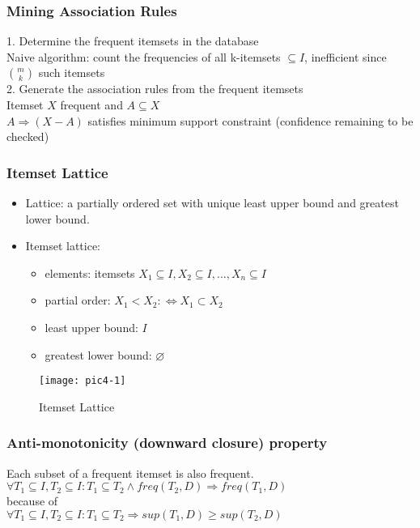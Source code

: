 \documentclass[../notes.tex]{subfiles}
\begin{document}
\subsubsection{Mining Association Rules}
1. Determine the frequent itemsets in the database \\
Naive algorithm: count the frequencies of all k-itemsets $\subseteq I$, inefficient since $\binom mk$ such itemsets \\

2. Generate the association rules from the frequent itemsets \\
Itemset $X$ frequent and $A \subseteq X$ \\
$A \Rightarrow (X-A)$ satisfies minimum support constraint (confidence remaining to be checked)

\subsubsection{Itemset Lattice}
\begin{itemize}
  \item Lattice: a partially ordered set with unique least upper bound and greatest lower bound.
  \item Itemset lattice:
    \begin{itemize}
      \item elements: itemsets $X_1 \subseteq I, X_2 \subseteq I, ..., X_n \subseteq I$
      \item partial order: $X_1 < X_2 :\Leftrightarrow X_1 \subset X_2$
      \item least upper bound: $I$
      \item greatest lower bound: $\varnothing$
    \end{itemize}
\end{itemize}

\begin{figure}[h]
\centering
\caption{Itemset Lattice}
\texttt{[image: pic4-1]}
\end{figure}

\subsubsection{Anti-monotonicity (downward closure) property}
Each subset of a frequent itemset is also frequent. \\
$\forall T_1 \subseteq I, T_2 \subseteq I: T_1 \subseteq T_2 \land freq(T_2, D) \Rightarrow freq(T_1, D)$ \\
because of \\
$\forall T_1 \subseteq I, T_2 \subseteq I: T_1 \subseteq T_2 \Rightarrow sup(T_1, D) \ge sup(T_2, D)$ \\
\end{document}
